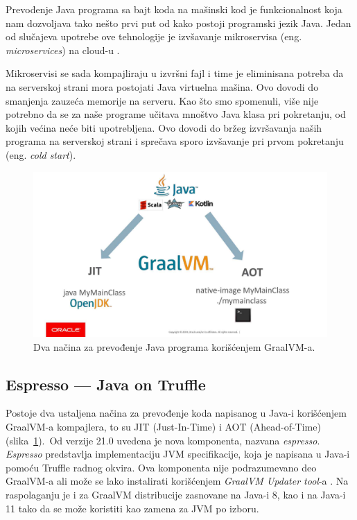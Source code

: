 \documentclass[a4paper]{article}
\begin{document}
Prevođenje Java programa sa bajt koda na mašinski kod je funkcionalnost koja nam dozvoljava tako nešto prvi put od kako postoji programski jezik Java. Jedan od slučajeva upotrebe ove tehnologije je izvšavanje mikroservisa (eng. \emph{microservices}) na cloud-u \cite{sipek21}.

Mikroservisi se sada kompajliraju u izvršni fajl i time je eliminisana potreba da na serverskoj strani mora postojati Java virtuelna mašina. Ovo dovodi do smanjenja zauzeća memorije na serveru. Kao što smo spomenuli,  više nije potrebno da se za naše programe učitava mnoštvo Java klasa pri pokretanju, od kojih većina neće biti upotrebljena. Ovo dovodi do bržeg izvršavanja naših programa na serverskoj strani i sprečava sporo izvšavanje pri prvom pokretanju (eng. \emph{cold start}). 

\begin{figure}
	\begin{center}
	\includegraphics[scale=0.25]{imgs/run_java.jpg}
	\end{center}
	\caption{Dva načina za prevođenje Java programa korišćenjem GraalVM-a.}
	\label{fig:runjava}
\end{figure}


\subsection{Espresso --- Java on Truffle}
\label{sub:espresso}

Postoje dva ustaljena načina za prevođenje koda napisanog u Java-i korišćenjem GraalVM-a kompajlera, to su JIT (Just-In-Time) i AOT (Ahead-of-Time) (slika~\ref{fig:runjava}).\ Od verzije 21.0 uvedena je nova komponenta, nazvana \emph{espresso}. \emph{Espresso} predstavlja implementaciju JVM specifikacije, koja je napisana u Java-i pomoću Truffle radnog okvira. Ova komponenta nije podrazumevano deo GraalVM-a ali može se lako instalirati korišćenjem \emph{GraalVM Updater tool}-a \cite{graalvm}. Na raspolaganju je i za GraalVM distribucije zasnovane na Java-i 8, kao i na Java-i 11 tako da se može koristiti kao zamena za JVM po izboru.
\end{document}
